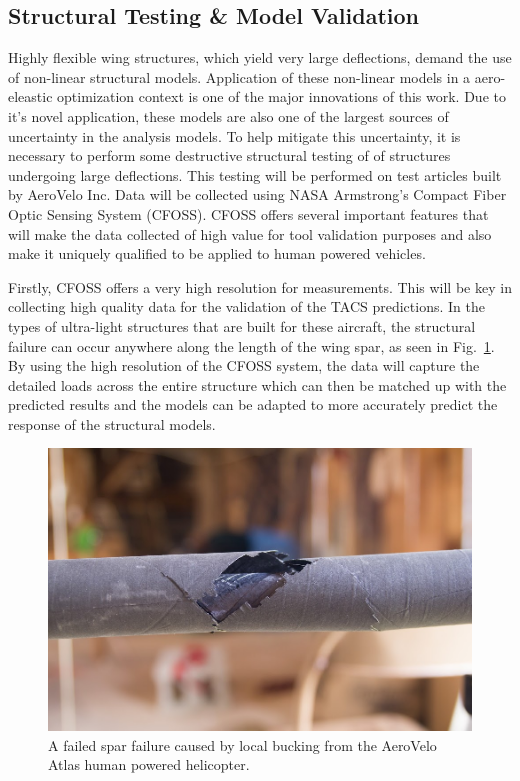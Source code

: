 \documentclass[]{aiaa-tc}
\begin{document}
    \subsection{Structural Testing \& Model Validation}
        
        Highly flexible wing structures, which yield very large deflections, demand the use of non-linear structural models. 
        Application of these non-linear models in a aero-eleastic optimization context is one of the major innovations of this 
        work. Due to it's novel application, these models are also one of the largest sources of uncertainty in the analysis models. 
        To help mitigate this uncertainty, it is necessary to perform some destructive structural testing of of structures undergoing large 
        deflections. This testing will be performed on test articles built by AeroVelo Inc. Data will be collected using 
        NASA Armstrong's Compact Fiber Optic Sensing System (CFOSS). CFOSS offers several important features that will make the 
        data collected of high value for tool validation purposes and also make it uniquely qualified to be applied to human powered vehicles. 

        Firstly, CFOSS offers a very high resolution for measurements. This will be key in collecting high quality data for the validation 
        of the TACS predictions. In the types of ultra-light structures that are built for these aircraft, the structural failure can 
        occur anywhere along the length of the wing spar, as seen in Fig.~\ref{fig:spar-failure}. By using the 
        high resolution of the CFOSS system, the data will capture the detailed loads across the entire structure 
        which can then be matched up with the predicted results and the models can be adapted to more accurately 
        predict the response of the structural models.

        \begin{figure}[!hbt]
            \centering
            \includegraphics[width=.5\textwidth]{images/spar_failure}
            \caption{A failed spar failure caused by local bucking from the AeroVelo Atlas human powered helicopter. }
            \label{fig:spar-failure}
        \end{figure}
\end{document}
